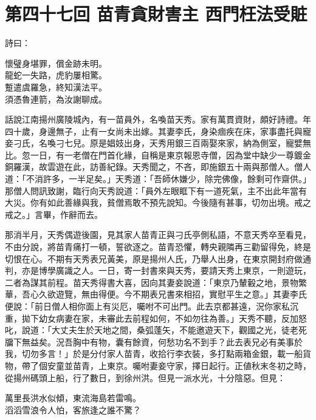 
\chapter*{第四十七回 苗青貪財害主 西門枉法受賍}


詩曰：

\begin{myquote}
懷璧身堪罪，償金跡未明。\\龍蛇一失路，虎豹屢相驚。\\蹔遣虞羅急，終知漢法平。\\須憑魯連箭，為汝謝聊成。
\end{myquote}

話說江南揚州廣陵城內，有一苗員外，名喚苗天秀。家有萬貫資財，頗好詩禮。年四十歲，身邊無子，止有一女尚未出嫁。其妻李氏，身染痼疾在床，家事盡托與寵妾刁氏，名喚刁七兒。原是娼妓出身，天秀用銀三百兩娶來家，納為側室，寵嬖無比。{}忽一日，有一老僧在門首化緣，自稱是東京報恩寺僧，因為堂中缺少一尊鍍金銅羅漢，故雲遊在此，訪善紀錄。天秀聞之，不吝，即施銀五十兩與那僧人。僧人道：「不消許多，一半足矣。」天秀道：「吾師休嫌少，除完佛像，餘剩可作齋供。」那僧人問訊致謝，臨行向天秀說道：「員外左眼眶下有一道死氣，主不出此年當有大災。你有如此善緣與我，貧僧焉敢不預先說知。今後隨有甚事，切勿出境。戒之戒之。」言畢，作辭而去。

那消半月，天秀偶遊後園，見其家人苗青正與刁氏亭側私語，不意天秀卒至看見，不由分說，將苗青痛打一頓，誓欲逐之。苗青恐懼，轉央親隣再三勸留得免，終是切恨在心。不期有天秀表兄黃美，原是揚州人氏，乃舉人出身，在東京開封府做通判，亦是博學廣識之人。一日，寄一封書來與天秀，要請天秀上東京，一則遊玩，二者為謀其前程。苗天秀得書大喜，因向其妻妾說道：「東京乃輦轂之地，景物繁華，吾心久欲遊覽，無由得便。今不期表兄書來相招，實慰平生之意。」其妻李氏便說：「前日僧人相你面上有災厄，囑咐不可出門。此去京都甚遠，況你家私沉重，拋下幼女病妻在家，未審此去前程如何，不如勿往為善。」天秀不聽，反加怒叱，說道：「大丈夫生於天地之間，桑弧蓬矢，不能邀遊天下，觀國之光，徒老死牖下無益矣。況吾胸中有物，囊有餘資，何愁功名不到手？此去表兄必有美事於我，切勿多言！」於是分付家人苗青，收拾行李衣裝，多打點兩箱金銀，載一船貨物，帶了個安童並苗青，上東京。囑咐妻妾守家，擇日起行。正値秋末冬初之時，從揚州碼頭上船，行了數日，到徐州洪。但見一派水光，十分陰惡。但見：

\begin{myquote}
萬里長洪水似傾，東流海島若雷鳴。\\滔滔雪浪令人怕，客旅逢之誰不驚？
\end{myquote}

